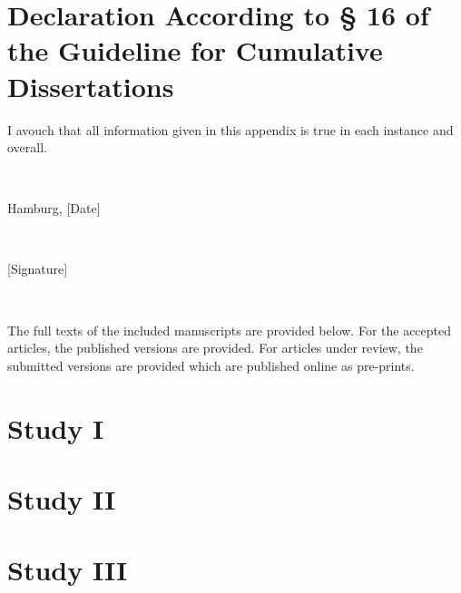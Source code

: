 \documentclass[
]{scrbook}
\begin{document}
\section*{Declaration According to § 16 of the Guideline for Cumulative Dissertations}\label{declaration-according-to-16-of-the-guideline-for-cumulative-dissertations}

I avouch that all information given in this appendix is true in each instance and overall.

~

Hamburg, {[}Date{]}

~

{[}Signature{]}

~

The full texts of the included manuscripts are provided below. For the accepted articles, the published versions are provided. For articles under review, the submitted versions are provided which are published online as pre-prints.

\newpage

\section*{Study I}\label{studyI}

\begin{minipage}{\textwidth}

\end{minipage}



\newpage

\section*{Study II}\label{studyII}

\begin{minipage}{\textwidth}

\end{minipage}



\newpage

\section*{Study III}\label{studyIII}
\end{document}
